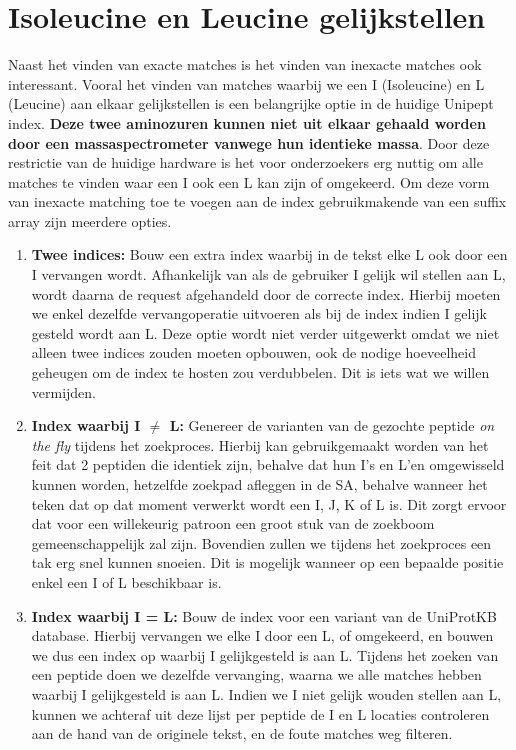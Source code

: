 \section{Isoleucine en Leucine gelijkstellen}\label{sec:isoleucine-en-leucine-equivalentie}
Naast het vinden van exacte matches is het vinden van inexacte matches ook interessant.
Vooral het vinden van matches waarbij we een I (Isoleucine) en L (Leucine) aan elkaar gelijkstellen is een belangrijke optie in de huidige Unipept index.
\textbf{Deze twee aminozuren kunnen niet uit elkaar gehaald worden door een massaspectrometer vanwege hun identieke massa}.
Door deze restrictie van de huidige hardware is het voor onderzoekers erg nuttig om alle matches te vinden waar een I ook een L kan zijn of omgekeerd.
Om deze vorm van inexacte matching toe te voegen aan de index gebruikmakende van een suffix array zijn meerdere opties.
\begin{enumerate}
    \item \textbf{Twee indices:} Bouw een extra index waarbij in de tekst elke L ook door een I vervangen wordt.
    Afhankelijk van als de gebruiker I gelijk wil stellen aan L, wordt daarna de request afgehandeld door de correcte index.
    Hierbij moeten we enkel dezelfde vervangoperatie uitvoeren als bij de index indien I gelijk gesteld wordt aan L\@.
    Deze optie wordt niet verder uitgewerkt omdat we niet alleen twee indices zouden moeten opbouwen, ook de nodige hoeveelheid geheugen om de index te hosten zou verdubbelen.
    Dit is iets wat we willen vermijden.
    \item \textbf{Index waarbij I $\neq$ L:} Genereer de varianten van de gezochte peptide \textit{on the fly} tijdens het zoekproces.
    Hierbij kan gebruikgemaakt worden van het feit dat 2 peptiden die identiek zijn, behalve dat hun I's en L'en omgewisseld kunnen worden, hetzelfde zoekpad afleggen in de SA, behalve wanneer het teken dat op dat moment verwerkt wordt een I, J, K of L is.
    Dit zorgt ervoor dat voor een willekeurig patroon een groot stuk van de zoekboom gemeenschappelijk zal zijn.
    Bovendien zullen we tijdens het zoekproces een tak erg snel kunnen snoeien.
    Dit is mogelijk wanneer op een bepaalde positie enkel een I of L beschikbaar is.
    \item \textbf{Index waarbij I = L:} Bouw de index voor een variant van de UniProtKB database.
    Hierbij vervangen we elke I door een L, of omgekeerd, en bouwen we dus een index op waarbij I gelijkgesteld is aan L\@.
    Tijdens het zoeken van een peptide doen we dezelfde vervanging, waarna we alle matches hebben waarbij I gelijkgesteld is aan L\@.
    Indien we I niet gelijk wouden stellen aan L, kunnen we achteraf uit deze lijst per peptide de I en L locaties controleren aan de hand van de originele tekst, en de foute matches weg filteren.
\end{enumerate}

